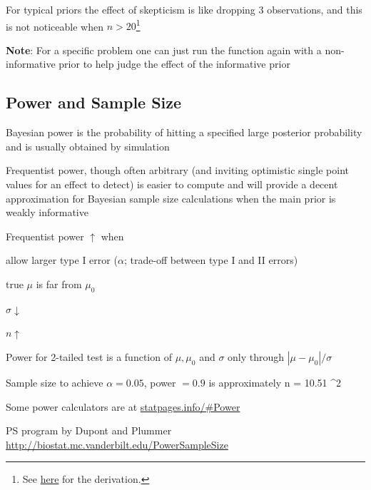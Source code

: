 \item For typical priors the effect of skepticism is like dropping 3 observations, and this is not noticeable when $n > 20$\footnote{See \href{http://hbiostat.org/doc/bayes/course.html\#331_alternative_take_on_the_prior}{here} for the derivation.}
\item \textbf{Note}: For a specific problem one can just run the  function again with a non-informative prior to help judge the effect of the informative prior
\ei


\subsection{Power and Sample Size} 
\bi
\item Bayesian power is the probability of hitting a specified large
  posterior probability and is usually obtained by simulation
\item Frequentist power, though often arbitrary (and inviting
  optimistic single point values for an effect to detect) is easier to
  compute and will provide a decent approximation for Bayesian sample
  size calculations when the main prior is weakly informative
\item Frequentist power $\uparrow$ when
 \bi
 \item allow larger type I error ($\alpha$; trade-off between type I
   and II errors)
 \item true $\mu$ is far from $\mu_{0}$
 \item $\sigma \downarrow$
 \item $n \uparrow$
 \ei
\item Power for 2-tailed test is a function of $\mu, \mu_{0}$ and
  $\sigma$ only through  $|\mu - \mu_{0}| / \sigma$
\item Sample size to achieve $\alpha=0.05$, power $=0.9$ is approximately
\beq
n = 10.51 ^{2}
\eeq
\item Some power calculators are at \url{statpages.info/#Power}
\item PS program by Dupont and Plummer \url{http://biostat.mc.vanderbilt.edu/PowerSampleSize}

